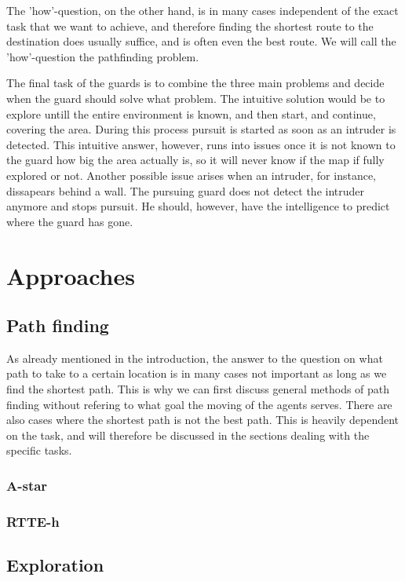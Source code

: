 \documentclass{report}
\begin{document}
	The 'how'-question, on the other hand, is in many cases independent of the exact task that we want to achieve, and therefore finding the shortest route to the destination does usually suffice, and is often even the best route. We will call the 'how'-question the pathfinding problem.

	The final task of the guards is to combine the three main problems and decide when the guard should solve what problem. The intuitive solution would be to explore untill the entire environment is known, and then start, and continue, covering the area. During this process pursuit is started as soon as an intruder is detected. This intuitive answer, however, runs into issues once it is not known to the guard how big the area actually is, so it will never know if the map if fully explored or not. Another possible issue arises when an intruder, for instance, dissapears behind a wall. The pursuing guard does not detect the intruder anymore and stops pursuit. He should, however, have the intelligence to predict where the guard has gone.

\chapter{Approaches}
	
	\section{Path finding}
		As already mentioned in the introduction, the answer to the question on what path to take to a certain location is in many cases not important as long as we find the shortest path. This is why we can first discuss general methods of path finding without refering to what goal the moving of the agents serves. There are also cases where the shortest path is not the best path. This is heavily dependent on the task, and will therefore be discussed in the sections dealing with the specific tasks.

		\subsection{A-star}
			

		\subsection{RTTE-h}
			

	\section{Exploration}
\end{document}
